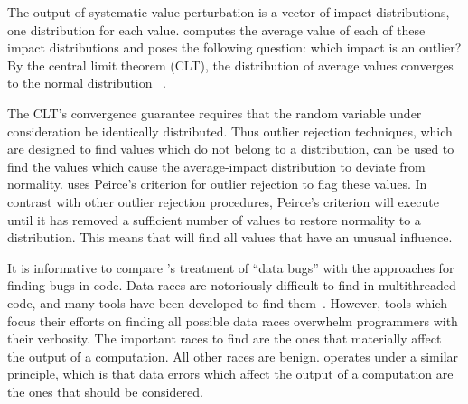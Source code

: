 {The output of systematic value perturbation is a vector of impact distributions, one distribution for each value.  \checkcell{} computes the average value of each of these impact distributions and poses the following question: which impact is an outlier?  By the central limit theorem (CLT), the distribution of average values converges to the normal distribution ~\cite{FIXME}.

The CLT's convergence guarantee requires that the random variable under consideration be identically distributed.  Thus outlier rejection techniques, which are designed to find values which do not belong to a distribution, can be used to find the values which cause the average-impact distribution to deviate from normality.  \checkcell{} uses Peirce's criterion for outlier rejection to flag these values.  In contrast with other outlier rejection procedures, Peirce's criterion will execute until it has removed a sufficient number of values to restore normality to a distribution.  This means that \checkcell{} will find all values that have an unusual influence.

It is informative to compare \checkcell{}'s treatment of ``data bugs'' with the approaches for finding bugs in code.  Data races are notoriously difficult to find in multithreaded code, and many tools have been developed to find them~\cite{FIXME}.  However, tools which focus their efforts on finding all possible data races overwhelm programmers with their verbosity.  The important races to find are the ones that materially affect the output of a computation.  All other races are benign.  \checkcell{} operates under a similar principle, which is that data errors which affect the output of a computation are the ones that should be considered.

}
